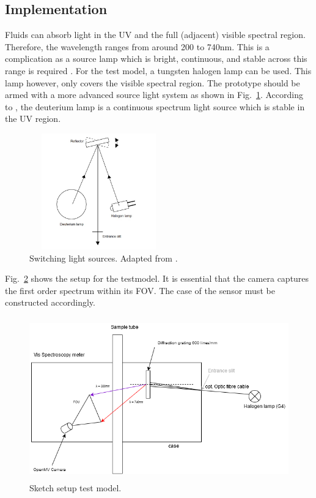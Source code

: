 \documentclass[aps,twocolumn,twoside,secnumarabic,balancelastpage,amsmath,amssymb,nofootinbib,hyperref=pdftex]{revtex4}
\begin{document}
\subsection{Implementation}
Fluids can absorb light in the UV and the full (adjacent) visible spectral region. Therefore, the wavelength ranges from around 200 to 740nm. This is a complication as a source lamp which is bright, continuous, and stable across this range is required \cite{lssp}. For the test model, a tungsten halogen lamp can be used. This lamp however, only covers the visible spectral region. The prototype should be armed with a more advanced source light system as shown in Fig.~\ref{fig:sw-lssp}. According to \cite{lssp}, the deuterium lamp is a continuous spectrum light source which is stable in the UV region.  
\begin{figure}[htb]
\includegraphics[width=6cm, height=5cm]{sw-lssp.jpg}
\caption{Switching light sources. Adapted from \cite{lssp}.
\label{fig:sw-lssp}}
\end{figure}

Fig.~\ref{fig:testmodel-sketch} shows the setup for the testmodel. It is essential that the camera captures the first order spectrum within its FOV. The case of the sensor must be constructed accordingly.
\begin{figure}[htb]
\includegraphics[width=15cm, height=7cm]{Spectroscopy-testmodel.png}
\caption{Sketch setup test model.
\label{fig:testmodel-sketch}}
\end{figure}
\end{document}
